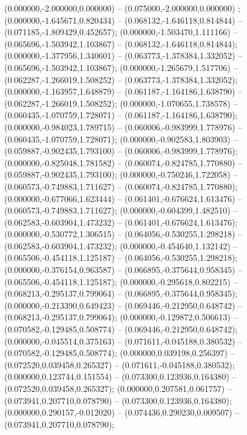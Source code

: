  (0.000000,-2.000000,0.000000) -- (0.075000,-2.000000,0.000000) ;
 (0.000000,-1.645671,0.820434) -- (0.068132,-1.646118,0.814844) -- (0.071185,-1.809429,0.452657);
 (0.000000,-1.503470,1.111166) -- (0.065696,-1.503942,1.103867) -- (0.068132,-1.646118,0.814844);
 (0.000000,-1.377956,1.340601) -- (0.063773,-1.378384,1.332052) -- (0.065696,-1.503942,1.103867);
 (0.000000,-1.265679,1.517706) -- (0.062287,-1.266019,1.508252) -- (0.063773,-1.378384,1.332052);
 (0.000000,-1.163957,1.648879) -- (0.061187,-1.164186,1.638790) -- (0.062287,-1.266019,1.508252);
 (0.000000,-1.070655,1.738578) -- (0.060435,-1.070759,1.728071) -- (0.061187,-1.164186,1.638790);
 (0.000000,-0.984023,1.789715) -- (0.060006,-0.983999,1.778976) -- (0.060435,-1.070759,1.728071);
 (0.000000,-0.902583,1.803903) -- (0.059887,-0.902435,1.793100) -- (0.060006,-0.983999,1.778976);
 (0.000000,-0.825048,1.781582) -- (0.060074,-0.824785,1.770880) -- (0.059887,-0.902435,1.793100);
 (0.000000,-0.750246,1.722058) -- (0.060573,-0.749883,1.711627) -- (0.060074,-0.824785,1.770880);
 (0.000000,-0.677066,1.623444) -- (0.061401,-0.676624,1.613476) -- (0.060573,-0.749883,1.711627);
 (0.000000,-0.604399,1.482510) -- (0.062583,-0.603904,1.473232) -- (0.061401,-0.676624,1.613476);
 (0.000000,-0.530772,1.306515) -- (0.064056,-0.530255,1.298218) -- (0.062583,-0.603904,1.473232);
 (0.000000,-0.454640,1.132142) -- (0.065506,-0.454118,1.125187) -- (0.064056,-0.530255,1.298218);
 (0.000000,-0.376154,0.963587) -- (0.066895,-0.375644,0.958345) -- (0.065506,-0.454118,1.125187);
 (0.000000,-0.295618,0.802215) -- (0.068213,-0.295137,0.799064) -- (0.066895,-0.375644,0.958345);
 (0.000000,-0.213390,0.649423) -- (0.069446,-0.212950,0.648742) -- (0.068213,-0.295137,0.799064);
 (0.000000,-0.129872,0.506613) -- (0.070582,-0.129485,0.508774) -- (0.069446,-0.212950,0.648742);
 (0.000000,-0.045514,0.375163) -- (0.071611,-0.045188,0.380532) -- (0.070582,-0.129485,0.508774);
 (0.000000,0.039198,0.256397) -- (0.072520,0.039458,0.265327) -- (0.071611,-0.045188,0.380532);
 (0.000000,0.123744,0.151554) -- (0.073300,0.123936,0.164380) -- (0.072520,0.039458,0.265327);
 (0.000000,0.207581,0.061757) -- (0.073941,0.207710,0.078790) -- (0.073300,0.123936,0.164380);
 (0.000000,0.290157,-0.012020) -- (0.074436,0.290230,0.009507) -- (0.073941,0.207710,0.078790);
